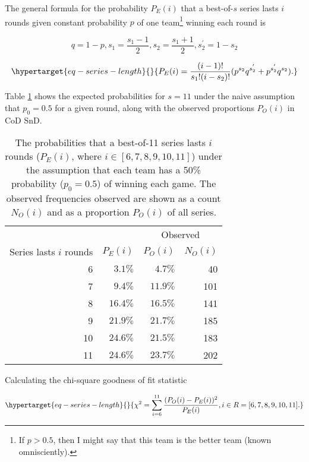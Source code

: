 \documentclass{article}
\begin{document}
The general formula for the probability \(P_E(i)\) that a best-of-\(s\)
series lasts \(i\) rounds given constant probability \(p\) of one
team\footnote{If \(p > 0.5\), then I might say that this team is the
  better team (known omnisciently).} winning each round is

\[
q = 1 - p, s_1 = \frac{s_1 - 1}{2}, s_2 = \frac{s_1 + 1}{2}, s_2^{'} = 1 - s_2
\]

\begin{equation}\protect\hypertarget{eq-series-length}{}{
P_E(i) = \frac{(i - 1)!}{s_1!(i - s_2)!}(p^{s_2}q^{s_2^{'}} + p^{s_2^{'}}q^{s_2}).
}\label{eq:series-length}\end{equation}

Table \ref{tbl:cod-prob-series-lasting-i-rounds} shows the expected
probabilities for \(s = 11\) under the naive assumption that
\(p_0 = 0.5\) for a given round, along with the observed proportions
\(P_O(i)\) in CoD SnD.

\begin{longtable}{rrrr}
  \caption{The probabilities that a best-of-11 series lasts $i$ rounds ($P_E(i)$, where $i \in [6, 7, 8, 9, 10, 11]$) under the assumption that each team has a 50\% probability ($p_0 = 0.5$) of winning each game. The observed frequencies observed are shown as a count $N_O(i)$ and as a proportion $P_O(i)$ of all series.}\label{tbl:cod-prob-series-lasting-i-rounds} \\
  \toprule
  &  & \multicolumn{2}{c}{Observed} \\ 
  \cmidrule(lr){3-4}
  Series lasts $i$ rounds & $P_E(i)$ & $P_O(i)$ & $N_O(i)$ \\ 
  \midrule
  6 & $3.1\%$ & $4.7\%$ & 40 \\ 
  7 & $9.4\%$ & $11.9\%$ & 101 \\ 
  8 & $16.4\%$ & $16.5\%$ & 141 \\ 
  9 & $21.9\%$ & $21.7\%$ & 185 \\ 
  10 & $24.6\%$ & $21.5\%$ & 183 \\ 
  11 & $24.6\%$ & $23.7\%$ & 202 \\ 
  \bottomrule
\end{longtable}

Calculating the chi-square goodness of fit statistic

\begin{equation}\protect\hypertarget{eq-series-length}{}{
\chi^2 = \sum^{11}_{i=6} \frac{(P_O(i) - P_E(i))^2}{P_E(i)}, i \in R = [6, 7, 8, 9, 10, 11].
}\label{eq:chi-squ-test}\end{equation}
\end{document}
